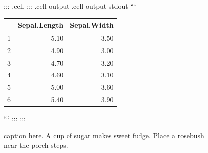 \documentclass[
  letterpaper,
  DIV=11,
  numbers=noendperiod]{scrartcl}
\begin{document}
\begin{figure}
  \centering
::: {.cell}
::: {.cell-output .cell-output-stdout}
```

\begin{tabular}{rrr}
  \hline
 & Sepal.Length & Sepal.Width \\ 
  \hline
1 & 5.10 & 3.50 \\ 
  2 & 4.90 & 3.00 \\ 
  3 & 4.70 & 3.20 \\ 
  4 & 4.60 & 3.10 \\ 
  5 & 5.00 & 3.60 \\ 
  6 & 5.40 & 3.90 \\ 
   \hline
\end{tabular}
```
:::
:::

  \caption{\label{tbl-mtsmall}caption here. A cup of sugar makes sweet fudge. Place a rosebush near the porch steps.}
  \vspace{-3pt}
\end{figure}
\end{document}
